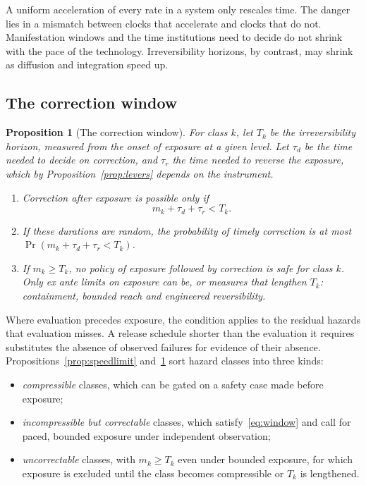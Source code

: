 \documentclass[11pt]{article}
\theoremstyle{plain}
\newtheorem{proposition}{Proposition}
\theoremstyle{definition}
\begin{document}
A uniform acceleration of every rate in a system only rescales time. The danger lies in a mismatch between clocks that accelerate and clocks that do not. Manifestation windows and the time institutions need to decide do not shrink with the pace of the technology. Irreversibility horizons, by contrast, may shrink as diffusion and integration speed up.

\subsection{The correction window}

\begin{proposition}[The correction window]\label{prop:window}
For class $k$, let $T_k$ be the irreversibility horizon, measured from the onset of exposure at a given level. Let $\tau_d$ be the time needed to decide on correction, and $\tau_r$ the time needed to reverse the exposure, which by Proposition~\ref{prop:levers} depends on the instrument.
\begin{enumerate}[label=(\roman*),leftmargin=*]
\item Correction after exposure is possible only if
\begin{equation}\label{eq:window}
m_k+\tau_d+\tau_r<T_k .
\end{equation}
\item If these durations are random, the probability of timely correction is at most $\Pr(m_k+\tau_d+\tau_r<T_k)$.
\item If $m_k\ge T_k$, no policy of exposure followed by correction is safe for class $k$. Only ex ante limits on exposure can be, or measures that lengthen $T_k$: containment, bounded reach and engineered reversibility.
\end{enumerate}
\end{proposition}

Where evaluation precedes exposure, the condition applies to the residual hazards that evaluation misses. A release schedule shorter than the evaluation it requires substitutes the absence of observed failures for evidence of their absence. Propositions~\ref{prop:speedlimit} and~\ref{prop:window} sort hazard classes into three kinds:
\begin{itemize}[leftmargin=*]
\item \emph{compressible} classes, which can be gated on a safety case made before exposure;
\item \emph{incompressible but correctable} classes, which satisfy~\eqref{eq:window} and call for paced, bounded exposure under independent observation;
\item \emph{uncorrectable} classes, with $m_k\ge T_k$ even under bounded exposure, for which exposure is excluded until the class becomes compressible or $T_k$ is lengthened.
\end{itemize}
\end{document}
